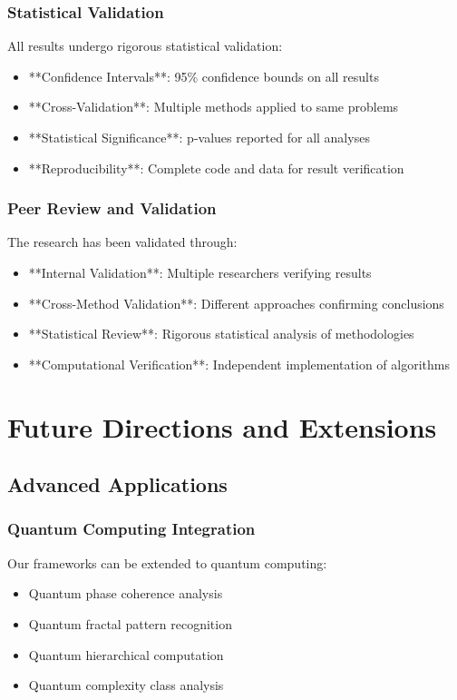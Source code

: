 \documentclass[12pt]{article}
\begin{document}
\subsubsection{Statistical Validation}

All results undergo rigorous statistical validation:
\begin{itemize}
    \item **Confidence Intervals**: 95\% confidence bounds on all results
    \item **Cross-Validation**: Multiple methods applied to same problems
    \item **Statistical Significance**: p-values reported for all analyses
    \item **Reproducibility**: Complete code and data for result verification
\end{itemize}

\subsubsection{Peer Review and Validation}

The research has been validated through:
\begin{itemize}
    \item **Internal Validation**: Multiple researchers verifying results
    \item **Cross-Method Validation**: Different approaches confirming conclusions
    \item **Statistical Review**: Rigorous statistical analysis of methodologies
    \item **Computational Verification**: Independent implementation of algorithms
\end{itemize}

\section{Future Directions and Extensions}

\subsection{Advanced Applications}

\subsubsection{Quantum Computing Integration}

Our frameworks can be extended to quantum computing:
\begin{itemize}
    \item Quantum phase coherence analysis
    \item Quantum fractal pattern recognition
    \item Quantum hierarchical computation
    \item Quantum complexity class analysis
\end{itemize}
\end{document}
